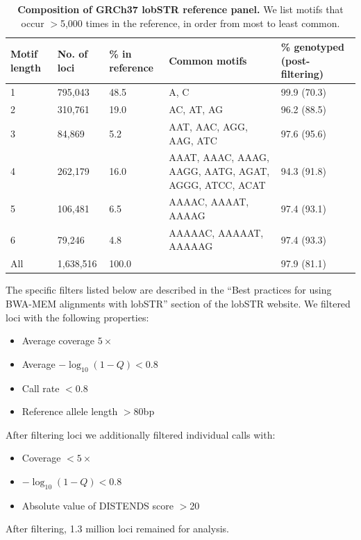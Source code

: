 \begin{table}[h!]
\centering
\label{tab:sgdptab1}
\begin{adjustbox}{width=1\textwidth}
\begin{tabular}{l l l l l}
\hline
Motif length & No. of loci & \% in reference & Common motifs & \% genotyped (post-filtering) \\
\hline
1	& 795,043	& 48.5	& A, C	& 99.9 (70.3) \\
2	& 310,761	& 19.0	& AC, AT, AG& 	96.2 (88.5) \\
3	& 84,869	& 5.2	& AAT, AAC, AGG, AAG, ATC &	97.6 (95.6) \\
4	& 262,179	& 16.0	& AAAT, AAAC, AAAG, AAGG, AATG, AGAT, AGGG, ATCC, ACAT	& 94.3 (91.8) \\
5	& 106,481	& 6.5	& AAAAC, AAAAT, AAAAG	& 97.4 (93.1)\\
6	& 79,246	& 4.8	& AAAAAC, AAAAAT, AAAAAG	& 97.4 (93.3) \\
All &	1,638,516	& 100.0	&	& 97.9 (81.1) \\
\hline
\end{tabular}
\end{adjustbox}
\caption{\textbf{Composition of GRCh37 lobSTR reference panel.} We list motifs that occur $>$5,000 times in the reference, in order from most to least common.}
\end{table}

The specific filters listed below are described in the ``Best practices for using BWA-MEM alignments with lobSTR'' section of the lobSTR website. We filtered loci with the following properties:

\begin{itemize}
\item Average coverage $5 \times$
\item Average $-\log_{10}(1-Q)<0.8$
\item Call rate $<0.8$
\item Reference allele length $>$80bp
\end{itemize}

After filtering loci we additionally filtered individual calls with:

\begin{itemize}
\item Coverage $<5 \times$
\item $-\log_{10}(1-Q)<0.8$
\item Absolute value of DISTENDS score $>$20
\end{itemize}
After filtering, 1.3 million loci remained for analysis.

